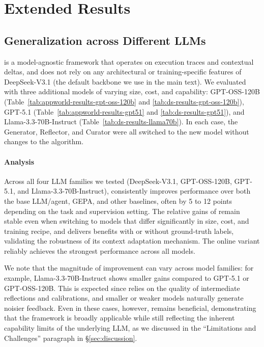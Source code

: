 \newpage
\section{Extended Results}

\subsection{Generalization across Different LLMs}
\label{subsec:generalization-across-llms}

\name is a model-agnostic framework that operates on execution traces and contextual deltas, and does not rely on any architectural or training-specific features of DeepSeek-V3.1 (the default backbone we use in the main text). 
We evaluated \name with three additional models of varying size, cost, and capability: GPT-OSS-120B (Table~\ref{tab:appworld-results-gpt-oss-120b} and \ref{tab:ds-results-gpt-oss-120b}), GPT-5.1 (Table~\ref{tab:appworld-results-gpt51} and \ref{tab:ds-results-gpt51}), and Llama-3.3-70B-Instruct (Table~\ref{tab:ds-results-llama70b}). 
In each case, the Generator, Reflector, and Curator were all switched to the new model without changes to the algorithm.

\paragraph{Analysis} Across all four LLM families we tested (DeepSeek-V3.1, GPT-OSS-120B, GPT-5.1, and Llama-3.3-70B-Instruct), \name consistently improves performance over both the base LLM/agent, GEPA, and other baselines, often by 5 to 12 points depending on the task and supervision setting. The relative gains of \name remain stable even when switching to models that differ significantly in size, cost, and training recipe, and \name delivers benefits with or without ground-truth labels, validating the robustness of its context adaptation mechanism. The online variant reliably achieves the strongest performance across all models. 

We note that the magnitude of improvement can vary across model families: for example, Llama-3.3-70B-Instruct shows smaller gains compared to GPT-5.1 or GPT-OSS-120B. This is expected since \name relies on the quality of intermediate reflections and calibrations, and smaller or weaker models naturally generate noisier feedback. Even in these cases, however, \name remains beneficial, demonstrating that the framework is broadly applicable while still reflecting the inherent capability limits of the underlying LLM, as we discussed in the “Limitations and Challenges” paragraph in \S\ref{sec:discussion}.

